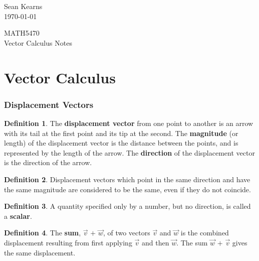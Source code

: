 \documentclass[12pt, a4paper]{article}
\theoremstyle{plain}
\theoremstyle{definition}
\newtheorem{definition}{Definition}[section]
\theoremstyle{remark}
\begin{document}
\author{Sean Kearns}

\begin{minipage}{0.4\textwidth}
\begin{flushleft}
Sean Kearns\\
\today
\end{flushleft}
\end{minipage}
\begin{minipage}{0.4\textwidth}
\begin{flushright}
MATH5470\\
Vector Calculus Notes
\end{flushright}
\end{minipage}



\tableofcontents











\newpage
\part{Vector Calculus}




\section{Displacement Vectors}

\begin{definition}
The \textbf{displacement vector} from one point to another is an arrow with its tail at the first point and its tip at the second.  The \textbf{magnitude} (or length) of the displacement vector is the distance between the points, and is represented by the length of the arrow.  The \textbf{direction} of the displacement vector is the direction of the arrow.
\end{definition}

\begin{definition}
Displacement vectors which point in the same direction and have the same magnitude are considered to be the same, even if they do not coincide.
\end{definition}

\begin{definition}
A quantity specified only by a number, but no direction, is called a \textbf{scalar}.
\end{definition}

\begin{definition}
The \textbf{sum}, $\vec{v}$ $+$ $\vec{w}$, of two vectors $\vec{v}$ and $\vec{w}$ is the combined displacement resulting from first applying $\vec{v}$ and then $\vec{w}$.  The sum $\vec{w}$ $+$ $\vec{v}$ gives the same displacement.
\end{definition}
\end{document}
